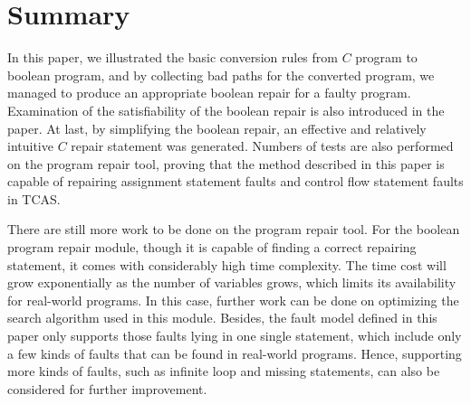 \section{Summary}
In this paper, we illustrated the basic conversion rules from $C$ program to boolean program, and by collecting bad paths for the converted program, we managed to produce an appropriate boolean repair for a faulty program. Examination of the satisfiability of the boolean repair is also introduced in the paper.
At last, by simplifying the boolean repair, an effective and relatively intuitive $C$ repair statement was generated.
Numbers of tests are also performed on the program repair tool, proving that the method described in this paper is capable of repairing assignment statement faults and control flow statement faults in TCAS.

There are still more work to be done on the program repair tool.
For the boolean program repair module, though it is capable of finding a correct repairing statement, it comes with considerably high time complexity.
The time cost will grow exponentially as the number of variables grows, which limits its availability for real-world programs.
In this case, further work can be done on optimizing the search algorithm used in this module.
Besides, the fault model defined in this paper only supports those faults lying in one single statement, which include only a few kinds of faults that can be found in real-world programs. Hence, supporting more kinds of faults, such as infinite loop and missing statements, can also be considered for further improvement.
